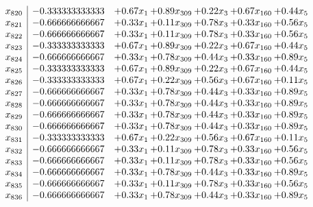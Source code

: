 \documentclass[8pt]{article}
\begin{document}
\[\begin{array}{c| c c@{\hskip 2pt} c@{\hskip 2pt} c@{\hskip 2pt} c@{\hskip 2pt} c@{\hskip 2pt} }
 x_{820}   &  -0.333333333333 & +  0.67 x_{1} & +  0.89 x_{309} & +  0.22 x_{3} & +  0.67 x_{160} & +  0.44 x_{5}\\
 x_{821}   &  -0.666666666667 & +  0.33 x_{1} & +  0.11 x_{309} & +  0.78 x_{3} & +  0.33 x_{160} & +  0.56 x_{5}\\
 x_{822}   &  -0.666666666667 & +  0.33 x_{1} & +  0.11 x_{309} & +  0.78 x_{3} & +  0.33 x_{160} & +  0.56 x_{5}\\
 x_{823}   &  -0.333333333333 & +  0.67 x_{1} & +  0.89 x_{309} & +  0.22 x_{3} & +  0.67 x_{160} & +  0.44 x_{5}\\
 x_{824}   &  -0.666666666667 & +  0.33 x_{1} & +  0.78 x_{309} & +  0.44 x_{3} & +  0.33 x_{160} & +  0.89 x_{5}\\
 x_{825}   &  -0.333333333333 & +  0.67 x_{1} & +  0.89 x_{309} & +  0.22 x_{3} & +  0.67 x_{160} & +  0.44 x_{5}\\
 x_{826}   &  -0.333333333333 & +  0.67 x_{1} & +  0.22 x_{309} & +  0.56 x_{3} & +  0.67 x_{160} & +  0.11 x_{5}\\
 x_{827}   &  -0.666666666667 & +  0.33 x_{1} & +  0.78 x_{309} & +  0.44 x_{3} & +  0.33 x_{160} & +  0.89 x_{5}\\
 x_{828}   &  -0.666666666667 & +  0.33 x_{1} & +  0.78 x_{309} & +  0.44 x_{3} & +  0.33 x_{160} & +  0.89 x_{5}\\
 x_{829}   &  -0.666666666667 & +  0.33 x_{1} & +  0.78 x_{309} & +  0.44 x_{3} & +  0.33 x_{160} & +  0.89 x_{5}\\
 x_{830}   &  -0.666666666667 & +  0.33 x_{1} & +  0.78 x_{309} & +  0.44 x_{3} & +  0.33 x_{160} & +  0.89 x_{5}\\
 x_{831}   &  -0.333333333333 & +  0.67 x_{1} & +  0.22 x_{309} & +  0.56 x_{3} & +  0.67 x_{160} & +  0.11 x_{5}\\
 x_{832}   &  -0.666666666667 & +  0.33 x_{1} & +  0.11 x_{309} & +  0.78 x_{3} & +  0.33 x_{160} & +  0.56 x_{5}\\
 x_{833}   &  -0.666666666667 & +  0.33 x_{1} & +  0.11 x_{309} & +  0.78 x_{3} & +  0.33 x_{160} & +  0.56 x_{5}\\
 x_{834}   &  -0.666666666667 & +  0.33 x_{1} & +  0.78 x_{309} & +  0.44 x_{3} & +  0.33 x_{160} & +  0.89 x_{5}\\
 x_{835}   &  -0.666666666667 & +  0.33 x_{1} & +  0.11 x_{309} & +  0.78 x_{3} & +  0.33 x_{160} & +  0.56 x_{5}\\
 x_{836}   &  -0.666666666667 & +  0.33 x_{1} & +  0.78 x_{309} & +  0.44 x_{3} & +  0.33 x_{160} & +  0.89 x_{5}\\

\end{array}\]
\end{document}
